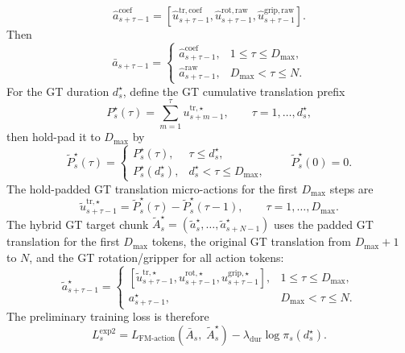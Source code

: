 \documentclass[10pt,twocolumn,letterpaper]{article}
\begin{document}
\begin{equation}
\hat a_{s+\tau-1}^{\mathrm{coef}}=
\left[
\hat u_{s+\tau-1}^{\mathrm{tr,coef}},
\hat u_{s+\tau-1}^{\mathrm{rot,raw}},
\hat u_{s+\tau-1}^{\mathrm{grip,raw}}
\right].
\end{equation}
Then
\begin{equation}
\bar a_{s+\tau-1}=
\begin{cases}
\hat a_{s+\tau-1}^{\mathrm{coef}}, & 1\le \tau\le D_{\max},\\[4pt]
\hat a_{s+\tau-1}^{\mathrm{raw}}, & D_{\max}<\tau\le N.
\end{cases}
\end{equation}
For the GT duration $d_s^{\star}$, define the GT cumulative translation prefix
\begin{equation}
P_s^{\star}(\tau)=
\sum_{m=1}^{\tau}u_{s+m-1}^{\mathrm{tr},\star},
\qquad
\tau=1,\ldots,d_s^{\star},
\end{equation}
then hold-pad it to $D_{\max}$ by
\begin{equation}
\widetilde P_s^{\star}(\tau)=
\begin{cases}
P_s^{\star}(\tau), & \tau\le d_s^{\star},\\
P_s^{\star}(d_s^{\star}), & d_s^{\star}<\tau\le D_{\max},
\end{cases}
\qquad
\widetilde P_s^{\star}(0)=0.
\end{equation}
The hold-padded GT translation micro-actions for the first $D_{\max}$ steps are
\begin{equation}
\widetilde u_{s+\tau-1}^{\mathrm{tr},\star}=
\widetilde P_s^{\star}(\tau)-\widetilde P_s^{\star}(\tau-1),
\qquad
\tau=1,\ldots,D_{\max}.
\end{equation}
The hybrid GT target chunk $\widetilde A_s^{\star}=(\widetilde a_s^{\star},\ldots,\widetilde a_{s+N-1}^{\star})$ uses the padded GT translation for the first $D_{\max}$ tokens, the original GT translation from $D_{\max}+1$ to $N$, and the GT rotation/gripper for all action tokens:
\begin{equation}
\widetilde a_{s+\tau-1}^{\star}=
\begin{cases}
\left[
\widetilde u_{s+\tau-1}^{\mathrm{tr},\star},
 u_{s+\tau-1}^{\mathrm{rot},\star},
 u_{s+\tau-1}^{\mathrm{grip},\star}
\right], & 1\le \tau\le D_{\max},\\[4pt]
a_{s+\tau-1}^{\star}, & D_{\max}<\tau\le N.
\end{cases}
\end{equation}
The preliminary training loss is therefore
\begin{equation}
L^{\mathrm{exp2}}_s=
L_{\text{FM-action}}\!\left(\bar A_s,\; \widetilde A_s^{\star}\right)
-\lambda_{\mathrm{dur}}\log \pi_s(d_s^{\star}).
\end{equation}
\end{document}
